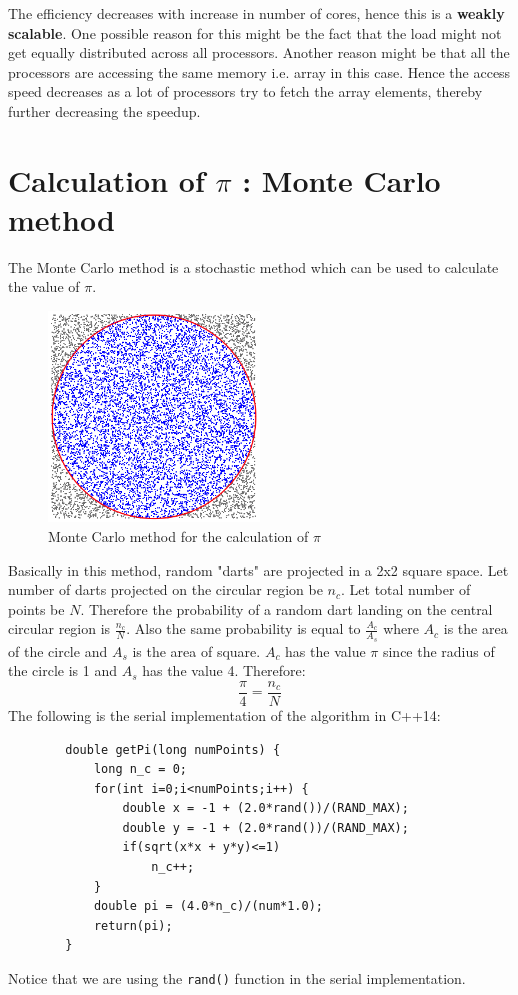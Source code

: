 \documentclass[12,a4paper]{article}
\def\code#1{\texttt{#1}}
\begin{document}
{    The efficiency decreases with increase in number of cores, hence this is a \textbf{weakly scalable}. One possible reason for this might be the fact that the load might not get equally distributed across all processors. Another reason might be that all the processors are accessing the same memory i.e. array in this case. Hence the access speed decreases as a lot of processors try to fetch the array elements, thereby further decreasing the speedup.
    
    \section{Calculation of $\pi$ : Monte Carlo method}
    
    The Monte Carlo method is a stochastic method which can be used to calculate the value of $\pi$.
    \begin{figure}[H]
        \centering
        \includegraphics[width=0.5\textwidth]{UgAd4.png}
        \caption{Monte Carlo method for the calculation of $\pi$}
        \label{fig:my_label}
    \end{figure}
    Basically in this method, random "darts" are projected in a 2x2 square space. Let number of darts projected on the circular region be $n_c$. Let total number of points be $N$. Therefore the probability of a random dart landing on the central circular region is $\frac{n_c}{N}$. Also the same probability is equal to $\frac{A_c}{A_s}$ where $A_c$ is the area of the circle and $A_s$ is the area of square. $A_c$ has the value $\pi$ since the radius of the circle is 1 and $A_s$ has the value 4. Therefore:
    \begin{equation}
        \frac{\pi}{4} = \frac{n_c}{N}
    \end{equation}
    The following is the serial implementation of the algorithm in C++14:
    \begin{lstlisting}
        double getPi(long numPoints) {
            long n_c = 0;
            for(int i=0;i<numPoints;i++) {
                double x = -1 + (2.0*rand())/(RAND_MAX);
                double y = -1 + (2.0*rand())/(RAND_MAX);
                if(sqrt(x*x + y*y)<=1)
                    n_c++;
            }
            double pi = (4.0*n_c)/(num*1.0);
            return(pi);
        }
    \end{lstlisting}
    Notice that we are using the \code{rand()} function in the serial implementation.
}
\end{document}

